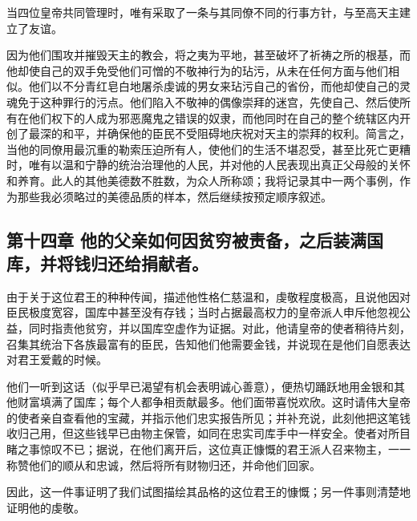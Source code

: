 当四位皇帝共同管理时，唯有采取了一条与其同僚不同的行事方针，与至高天主建立了友谊。\par

因为他们围攻并摧毁天主的教会，将之夷为平地，甚至破坏了祈祷之所的根基，而他却使自己的双手免受他们可憎的不敬神行为的玷污，从未在任何方面与他们相似。他们以不分青红皂白地屠杀虔诚的男女来玷污自己的省份，而他却使自己的灵魂免于这种罪行的污点。他们陷入不敬神的偶像崇拜的迷宫，先使自己、然后使所有在他们权下的人成为邪恶魔鬼之错误的奴隶，而他同时在自己的整个统辖区内开创了最深的和平，并确保他的臣民不受阻碍地庆祝对天主的崇拜的权利。简言之，当他的同僚用最沉重的勒索压迫所有人，使他们的生活不堪忍受，甚至比死亡更糟时，唯有以温和宁静的统治治理他的人民，并对他的人民表现出真正父母般的关怀和养育。此人的其他美德数不胜数，为众人所称颂；我将记录其中一两个事例，作为那些我必须略过的美德品质的样本，然后继续按预定顺序叙述。\par


\subsection{第十四章  他的父亲如何因贫穷被责备，之后装满国库，并将钱归还给捐献者。}

由于关于这位君王的种种传闻，描述他性格仁慈温和，虔敬程度极高，且说他因对臣民极度宽容，国库中甚至没有存钱；当时占据最高权力的皇帝派人申斥他忽视公益，同时指责他贫穷，并以国库空虚作为证据。对此，他请皇帝的使者稍待片刻，召集其统治下各族最富有的臣民，告知他们他需要金钱，并说现在是他们自愿表达对君王爱戴的时候。\par

他们一听到这话（似乎早已渴望有机会表明诚心善意），便热切踊跃地用金银和其他财富填满了国库；每个人都争相贡献最多。他们面带喜悦欢欣。这时请伟大皇帝的使者亲自查看他的宝藏，并指示他们忠实报告所见；并补充说，此刻他把这笔钱收归己用，但这些钱早已由物主保管，如同在忠实司库手中一样安全。使者对所目睹之事惊叹不已；据说，在他们离开后，这位真正慷慨的君王派人召来物主，一一称赞他们的顺从和忠诚，然后将所有财物归还，并命他们回家。\par

因此，这一件事证明了我们试图描绘其品格的这位君王的慷慨；另一件事则清楚地证明他的虔敬。\par


